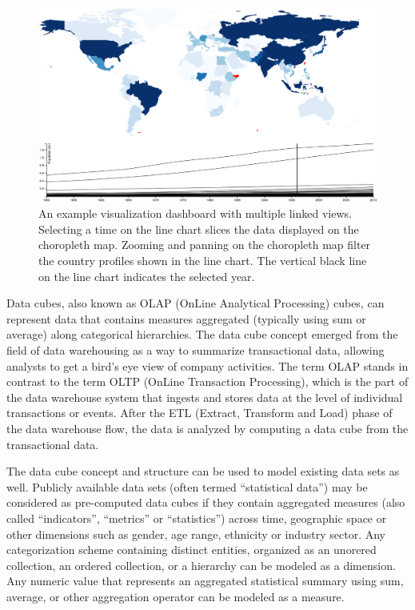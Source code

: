 \begin{figure}[h]
  \caption{An example visualization dashboard with multiple linked views. Selecting a time on the line chart slices the data displayed on the choropleth map. Zooming and panning on the choropleth map filter the country profiles shown in the line chart. The vertical black line on the line chart indicates the selected year.}
  \centering
  \includegraphics[width=\textwidth]{figures/linkedChoropleth.png}
\end{figure}


Data cubes, also known as OLAP (OnLine Analytical Processing) cubes, can represent data that contains measures aggregated (typically using sum or average) along categorical hierarchies. The data cube concept emerged from the field of data warehousing as a way to summarize transactional data, allowing analysts to get a bird's eye view of company activities. The term OLAP stands in contrast to the term OLTP (OnLine Transaction Processing), which is the part of the data warehouse system that ingests and stores data at the level of individual transactions or events. After the ETL (Extract, Transform and Load) phase of the data warehouse flow, the data is analyzed by computing a data cube from the transactional data.

The data cube concept and structure can be used to model existing data sets as well. Publicly available data sets (often termed ``statistical data'') may be considered as pre-computed data cubes if they contain aggregated measures (also called ``indicators'', ``metrics'' or ``statistics'') across time, geographic space or other dimensions such as gender, age range, ethnicity or industry sector. Any categorization scheme containing distinct entities, organized as an unorered collection, an ordered collection, or a hierarchy can be modeled as a dimension. Any numeric value that represents an aggregated statistical summary using sum, average, or other aggregation operator can be modeled as a measure.

